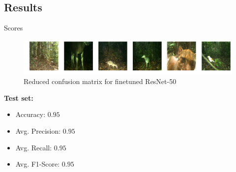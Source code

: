 \documentclass[10pt]{beamer}
\begin{document}
\subsection{Results}

\begin{frame}{Scores}
	\centering
	\begin{minipage}[r]{0.58\linewidth}
		\begin{figure}
			\hfill
			\hspace*{.5cm}\includegraphics[width=.8\columnwidth]{images/images_below.png}
			\caption{Reduced confusion matrix for finetuned ResNet-50}
		\end{figure}
	\end{minipage}
	\begin{minipage}[c]{0.38\linewidth}
		\textbf{Test set:}
		\begin{itemize}
			\item Accuracy: $0.95$
			\item Avg. Precision: $0.95$      
			\item Avg. Recall: $0.95$
			\item Avg. F1-Score: $0.95$
		\end{itemize}
	\end{minipage}
\end{frame}
\end{document}
